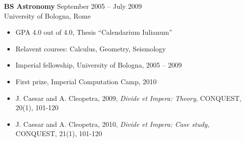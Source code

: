 \documentclass[a4paper,12pt,roman]{resume}
\begin{document}
\textbf{BS Astronomy} \hfill {September 2005 -- July 2009} \\
University of Bologna, Rome
\begin{itemize}
\item GPA 4.0 out of 4.0, Thesis ``Calendarium Iulianum''
\item Relavent courses: Calculus, Geometry, Seismology
\end{itemize}


\begin{itemize}
\item Imperial fellowship, University of Bologna, 2005 -- 2009
\item First prize, Imperial Computation Camp, 2010
\end{itemize}

\begin{itemize}
\item J. Caesar and A. Cleopetra, 2009, \textit{Divide et Impera: Theory}, CONQUEST, 20(1), 101-120
\item J. Caesar and A. Cleopetra, 2010, \textit{Divide et Impera: Case study}, CONQUEST, 21(1), 101-120
\end{itemize}

\end{document}

